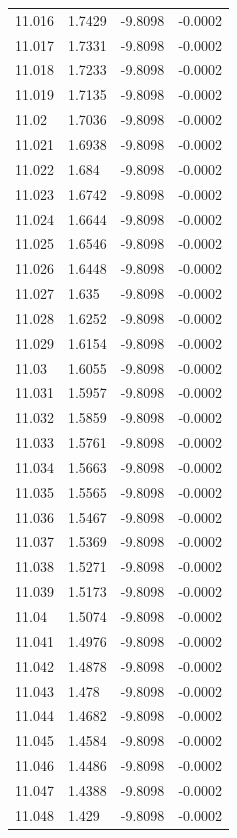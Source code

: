 \begin{tabular}{llll}
11.016 & 1.7429 & -9.8098 & -0.0002 \\
11.017 & 1.7331 & -9.8098 & -0.0002 \\
11.018 & 1.7233 & -9.8098 & -0.0002 \\
11.019 & 1.7135 & -9.8098 & -0.0002 \\
11.02 & 1.7036 & -9.8098 & -0.0002 \\
11.021 & 1.6938 & -9.8098 & -0.0002 \\
11.022 & 1.684 & -9.8098 & -0.0002 \\
11.023 & 1.6742 & -9.8098 & -0.0002 \\
11.024 & 1.6644 & -9.8098 & -0.0002 \\
11.025 & 1.6546 & -9.8098 & -0.0002 \\
11.026 & 1.6448 & -9.8098 & -0.0002 \\
11.027 & 1.635 & -9.8098 & -0.0002 \\
11.028 & 1.6252 & -9.8098 & -0.0002 \\
11.029 & 1.6154 & -9.8098 & -0.0002 \\
11.03 & 1.6055 & -9.8098 & -0.0002 \\
11.031 & 1.5957 & -9.8098 & -0.0002 \\
11.032 & 1.5859 & -9.8098 & -0.0002 \\
11.033 & 1.5761 & -9.8098 & -0.0002 \\
11.034 & 1.5663 & -9.8098 & -0.0002 \\
11.035 & 1.5565 & -9.8098 & -0.0002 \\
11.036 & 1.5467 & -9.8098 & -0.0002 \\
11.037 & 1.5369 & -9.8098 & -0.0002 \\
11.038 & 1.5271 & -9.8098 & -0.0002 \\
11.039 & 1.5173 & -9.8098 & -0.0002 \\
11.04 & 1.5074 & -9.8098 & -0.0002 \\
11.041 & 1.4976 & -9.8098 & -0.0002 \\
11.042 & 1.4878 & -9.8098 & -0.0002 \\
11.043 & 1.478 & -9.8098 & -0.0002 \\
11.044 & 1.4682 & -9.8098 & -0.0002 \\
11.045 & 1.4584 & -9.8098 & -0.0002 \\
11.046 & 1.4486 & -9.8098 & -0.0002 \\
11.047 & 1.4388 & -9.8098 & -0.0002 \\
11.048 & 1.429 & -9.8098 & -0.0002 \\

\end{tabular}
